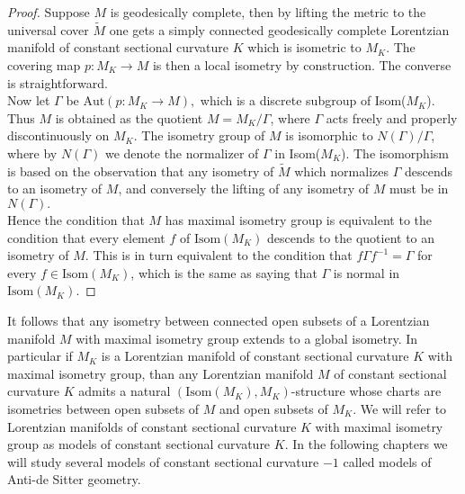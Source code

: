 \begin{proof}
    Suppose $M$ is geodesically complete, then by lifting the metric to the universal cover $\widetilde{M}$ one gets a simply connected geodesically complete Lorentzian manifold of constant sectional curvature $K$ which is isometric to $M_K$. The covering map $p:M_K\to M$ is then a local isometry by construction. The converse is straightforward. \\   
    Now let $\Gamma$ be $\text{Aut}(p:M_K\to M),$ which is a discrete subgroup of Isom($M_K$). Thus $M$ is obtained as the quotient $M=M_{K}/\Gamma$, where $\Gamma$ acts freely and properly discontinuously on $M_K$. The isometry group of $M$ is isomorphic to $N(\Gamma)/\Gamma$, where by $N(\Gamma)$ we denote the normalizer of $\Gamma$ in Isom($M_K$). The isomorphism is based on the observation that any isometry of $\widetilde{M}$ which normalizes $\Gamma$ descends to an isometry of $M$, and conversely the lifting of any isometry of $M$ must be in $N(\Gamma).$\\
    Hence the condition that $M$ has maximal isometry group is equivalent to the condition that every element $f$ of $\text{Isom}(M_K)$ descends to the quotient to an isometry of $M$. This is in turn equivalent to the condition that $f\Gamma f^{-1}=\Gamma$ for every $f\in \text{Isom}(M_K)$, which is the same as saying that $\Gamma$ is normal in $\text{Isom}(M_K)$.
\end{proof}
It follows that any isometry between connected open subsets of a Lorentzian manifold $M$ with
maximal isometry group extends to a global isometry. In particular if $M_K$ is a Lorentzian
manifold of constant sectional curvature $K$ with maximal isometry group, than any Lorentzian
manifold $M$ of constant sectional curvature $K$ admits a natural $(\text{Isom}(M_K),M_K)$-structure
whose charts are isometries between open subsets of $M$ and open subsets of $M_K$.
We will refer to Lorentzian manifolds of constant sectional curvature $K$ with maximal isometry group as models of constant sectional curvature $K$. In the following chapters we will study several models of constant sectional curvature $-1$ called models of Anti-de Sitter geometry.